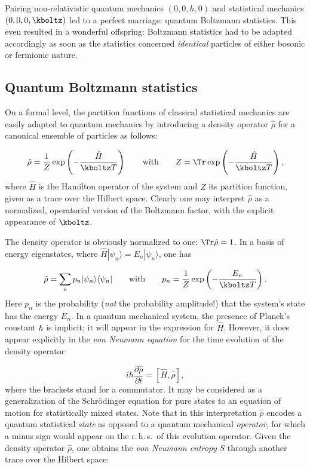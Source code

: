
\newpage {}
\label{sec:0011}

Pairing non-relativistic quantum mechanics $(0,0,h,0)$ and statistical mechanics $(0,0,0,\kboltz)$ led to a perfect marriage: quantum Boltzmann statistics. This even resulted in a wonderful offspring: Boltzmann statistics had to be adapted accordingly as soon as the statistics concerned \emph{identical} particles of either bosonic or fermionic nature.


\subsection*{Quantum Boltzmann statistics}

On a formal level, the partition functions of classical statistical mechanics are easily adapted to quantum mechanics by introducing a density operator $\hat\rho$ for a canonical ensemble of particles as follows:

\begin{equation*}
  \hat \rho=\frac{1}{Z} \exp\left(-\frac{\hat H}{\kboltz T}\right)
    \qquad \textrm{with} \qquad
    Z=\Tr \exp\left(-\frac{\hat H}{\kboltz T}\right),
\end{equation*}
%
where $\hat H$ is the Hamilton operator of the system and $Z$ its partition function, given as a trace over the Hilbert space. Clearly one may interpret $\hat\rho$ as a normalized, operatorial version of the Boltzmann factor, with the explicit appearance of $\kboltz$.

The density operator is obviously normalized to one: $\Tr \hat \rho=1$. In a basis of energy eigenstates, where $\hat H |\psi_n\rangle=E_n  |\psi_n\rangle$, one has

\begin{equation*}
  \hat \rho=\sum_n p_n |\psi_n\rangle \langle \psi_n|
    \qquad \textrm{with} \qquad
    p_n=\frac{1}{Z} \exp\left(-\frac{E_n}{\kboltz T}\right).
\end{equation*}
%
Here $p_n$ is the probability (\emph{not} the probability amplitude!) that the system's state has the energy $E_n$. In a quantum mechanical system, the presence of Planck's constant $h$ is implicit; it will appear in the expression for $\hat H$. However, it does appear explicitly in the \emph{von Neumann equation} for the time evolution of the density operator

\begin{equation*}\label{eq:vNeumann}
  i \hbar \frac{\partial \hat \rho}{\partial t}=\left[\hat H, \hat \rho\right],
\end{equation*}
%
where the brackets stand for a commutator. It may be considered as a generalization of the Schrödinger equation for pure states to an equation of motion for statistically mixed states. Note that in this interpretation $\hat \rho$ encodes a quantum statistical \emph{state} as opposed to a quantum mechanical \emph{operator}, for which a minus sign would appear on the r.\,h.\,s.\ of this evolution operator. Given the density operator $\hat \rho$, one obtains the \emph{von Neumann entropy} $S$ through another trace over the Hilbert space:

